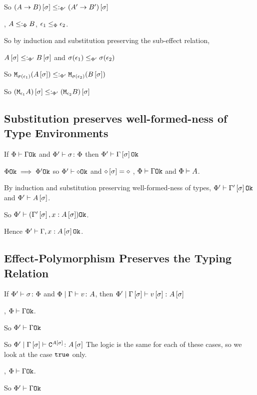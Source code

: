 {    So $(A\rightarrow B)\left[\sigma\right]\leq:_{\Phi'} (A'\rightarrow B')\left[\sigma\right]$


    \bi, $A\leq:_\Phi B$, $\epsilon_1\leq_{\Phi}\epsilon_2$.

    So by induction and substitution preserving the sub-effect relation, 

    $A\left[\sigma\right]\leq:_{\Phi'} B\left[\sigma\right]$ and $\sigma(\epsilon_1)\leq_{\Phi'}\sigma(\epsilon_2)$

    So $\texttt{M}_{\sigma(\epsilon_1)}{(A\left[\sigma\right])} \leq:_{\Phi'}\texttt{M}_{\sigma(\epsilon_2)}{(B\left[\sigma\right])}$

    So $(\texttt{M}_{\epsilon_1}{A})\left[\sigma\right] \leq:_{\Phi'}(\texttt{M}_{\epsilon_2}{B})\left[\sigma\right]$

    
    \subsection{Substitution preserves well-formed-ness of Type Environments}

    If $\Phi\vdash \Gamma \texttt{Ok}$ and $\Phi' \vdash \sigma \colon \Phi$ then $\Phi'\vdash \Gamma\left[\sigma\right] \texttt{Ok}$

    \proof
    $\Phi \texttt{Ok}\implies\Phi' \texttt{Ok}$ so $\Phi'\vdash \diamond \texttt{Ok}$
    and $\diamond\left[\sigma\right] = \diamond$
    \bi, $\Phi\vdash \Gamma \texttt{Ok}$ and $\Phi\vdash A$.

    By induction and substitution preserving well-formed-ness of types, $\Phi'\vdash \Gamma'\left[\sigma\right] \texttt{Ok}$ and $\Phi'\vdash A\left[\sigma\right]$.


    So $\Phi'\vdash (\Gamma'\left[\sigma\right], x: A\left[\sigma\right]) \texttt{Ok}$.

    Hence $\Phi'\vdash \Gamma, x: A\left[\sigma\right] \texttt{Ok}$.

    \subsection{Effect-Polymorphism Preserves the Typing Relation}

    If $\Phi' \vdash \sigma \colon \Phi$ and $\Phi\mid\Gamma \vdash v \colon A$, then $\Phi'\mid\Gamma\left[\sigma\right] \vdash v\left[\sigma\right] \colon A\left[\sigma\right]$


    \proof
    \bi, $\Phi\vdash \Gamma \texttt{Ok}$.

    So $\Phi'\vdash \Gamma \texttt{Ok}$

    So $\Phi'\mid\Gamma\left[\sigma\right] \vdash \texttt{C}^{A\left[\sigma\right]} \colon A\left[\sigma\right]$
    The logic is the same for each of these cases, so we look at the case $\texttt{true}$ only.

    \bi, $\Phi\vdash \Gamma \texttt{Ok}$.

    So $\Phi'\vdash \Gamma \texttt{Ok}$

}
